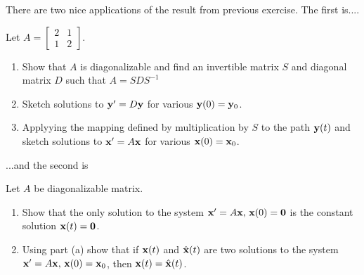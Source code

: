 \documentclass[10pt]{article}
\begin{document}
There are two nice applications of the result from previous exercise. The first is....
\begin{exercise}
    Let $A = \begin{bmatrix}
        2&1\\1&2
    \end{bmatrix}$.
    \begin{enumerate}[label=(\alph*)]
        \item Show that $A$ is diagonalizable and find an invertible matrix $S$ and diagonal matrix $D$ such that $A=SDS^{-1}$
        \item Sketch solutions to $\mathbf{y}'=D\mathbf{y}$ for various $\mathbf{y}(0)=\mathbf{y}_0$.
        \item Applyying the mapping defined by multiplication by $S$ to the path $\mathbf{y}(t)$ and sketch solutions to $\mathbf{x}'=A\mathbf{x}$ for various $\mathbf{x}(0)=\mathbf{x}_0$.
    \end{enumerate}
\end{exercise}
\newpage

...and the second is
\begin{exercise}
    Let $A$ be diagonalizable matrix.
    \begin{enumerate}[label=(\alph*)]
        \item Show that the only solution to the system $\mathbf{x}'=A\mathbf{x},\, \mathbf{x}(0)=\mathbf{0}$ is the constant solution $\mathbf{x}(t)=\mathbf{0}$.
        \item Using part (a) show that if $\mathbf{x}(t)$ and $\hat{\mathbf{x}}(t)$ are two solutions to the system $\mathbf{x}'=A\mathbf{x},\, \mathbf{x}(0)=\mathbf{x}_0$, then $\mathbf{x}(t)=\hat{\mathbf{x}}(t)$.
    \end{enumerate}
\end{exercise}
\end{document}
